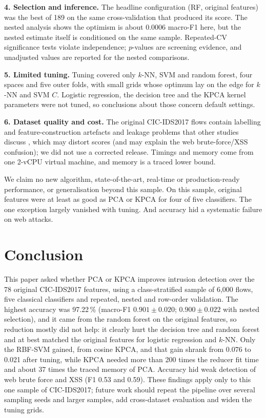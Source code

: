 \documentclass[runningheads]{llncs}
\begin{document}
\textbf{4. Selection and inference.} The headline configuration (RF, original features) was the best of 189 on the same cross-validation that produced its score. The nested analysis shows the optimism is about 0.0006 macro-F1 here, but the nested estimate itself is conditioned on the same sample. Repeated-CV significance tests violate independence; $p$-values are screening evidence, and unadjusted values are reported for the nested comparisons.

\textbf{5. Limited tuning.} Tuning covered only $k$-NN, SVM and random forest, four spaces and five outer folds, with small grids whose optimum lay on the edge for $k$-NN and SVM $C$. Logistic regression, the decision tree and the KPCA kernel parameters were not tuned, so conclusions about those concern default settings.

\textbf{6. Dataset quality and cost.} The original CIC-IDS2017 flows contain labelling and feature-construction artefacts and leakage problems that other studies discuss \cite{pramana,jiwueze}, which may distort scores (and may explain the web brute-force/XSS confusion); we did not use a corrected release. Timings and memory come from one 2-vCPU virtual machine, and memory is a traced lower bound.



We claim no new algorithm, state-of-the-art, real-time or production-ready performance, or generalisation beyond this sample. On this sample, original features were at least as good as PCA or KPCA for four of five classifiers. The one exception largely vanished with tuning. And accuracy hid a systematic failure on web attacks.

\section{Conclusion}
This paper asked whether PCA or KPCA improves intrusion detection over the 78 original CIC-IDS2017 features, using a class-stratified sample of 6{,}000 flows, five classical classifiers and repeated, nested and row-order validation. The highest accuracy was 97.22\,\% (macro-F1 $0.901\pm0.020$; $0.900\pm0.022$ with nested selection), and it came from the random forest on the original features, so reduction mostly did not help: it clearly hurt the decision tree and random forest and at best matched the original features for logistic regression and $k$-NN. Only the RBF-SVM gained, from cosine KPCA, and that gain shrank from 0.076 to 0.021 after tuning, while KPCA needed more than 200 times the reducer fit time and about 37 times the traced memory of PCA. Accuracy hid weak detection of web brute force and XSS (F1 0.53 and 0.59). These findings apply only to this one sample of CIC-IDS2017; future work should repeat the pipeline over several sampling seeds and larger samples, add cross-dataset evaluation and widen the tuning grids.
\end{document}

